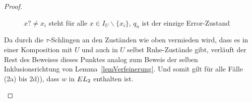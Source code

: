 \begin{proof}
\begin{itemize}
\begin{figure} [h!tbp]
\begin{center}
        \caption{$x?\neq x_i$ steht für alle $x\in I_U\backslash\{x_i\}$, $q_n$
          ist der einzige Error-Zustand}
\label{UmitEundTau}
      \end{center}
      \end{figure}
      Da durch die $\tau$-Schlingen an den Zuständen wie oben vermieden wird,
      dass es in einer Komposition mit $U$ und auch in $U$ selbst Ruhe-Zustände
      gibt, verläuft der Rest des Beweises dieses Punktes analog zum Beweis der
      selben Inklusionsrichtung von
      Lemma~\ref{lemVerfeinerung}. Und somit gilt für alle Fälle (2a) bis 2d)),
      dass $w$ in $EL{}_2$ enthalten ist.
  \end{itemize}


\end{proof}
